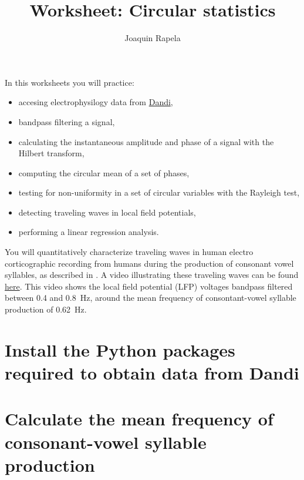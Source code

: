 \documentclass[12pt]{article}
\title{Worksheet: Circular statistics}
\author{Joaquin Rapela}
\begin{document}
\maketitle

In this worksheets you will practice:

\begin{itemize}

    \item accesing electrophysilogy data from
        \href{https://dandiarchive.org/}{Dandi},

    \item bandpass filtering a signal,

    \item calculating the instantaneous amplitude and phase of a signal with
        the Hilbert transform,

    \item computing the circular mean of a set of phases,

    \item testing for non-uniformity in a set of circular variables with the
        Rayleigh test,

    \item detecting traveling waves in local field potentials,

    \item performing a linear regression analysis.

\end{itemize}

You will quantitatively characterize traveling waves in human electro
corticographic recording from humans during the production of consonant vowel
syllables, as described in
\citet{rapelaInPrepTWsInSpeech,rapelaInPrepSyncTWs,rapelaInPrepSyncTWsII}. A video
illustrating these traveling waves can be found
\href{https://www.youtube.com/watch?v=6QYUGRqZ7Hc}{here}. This video shows the
local field potential (LFP) voltages bandpass filtered between 0.4 and 0.8~Hz, around the mean
frequency of consontant-vowel syllable production of 0.62~Hz.

\section{Install the Python packages required to obtain data from Dandi}

\section{Calculate the mean frequency of consonant-vowel syllable production}
\end{document}
